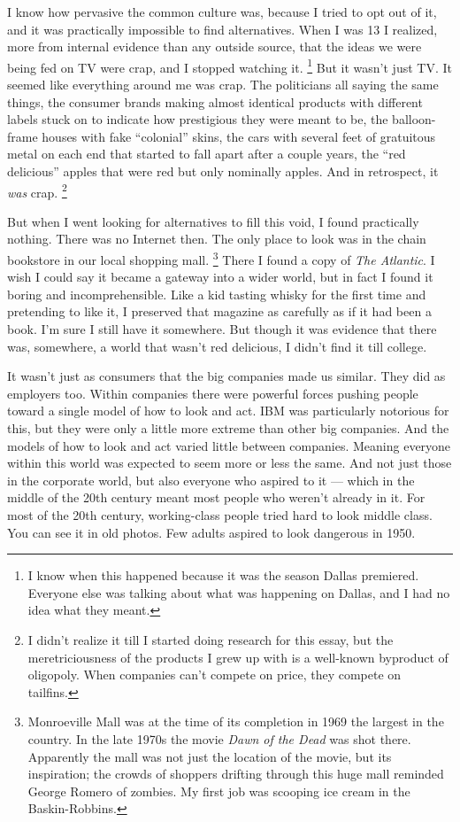 \documentclass[12pt]{book}
\begin{document}
I know how pervasive the common culture was, because I tried to opt out
of it, and it was practically impossible to find alternatives. When I
was 13 I realized, more from internal evidence than any outside source,
that the ideas we were being fed on TV were crap, and I stopped watching
it. \footnote{I know when this happened because it was the season Dallas
premiered. Everyone else was talking about what was happening on Dallas,
and I had no idea what they meant.} But it wasn't just TV. It seemed like
everything around me was crap. The politicians all saying the same
things, the consumer brands making almost identical products with
different labels stuck on to indicate how prestigious they were meant to
be, the balloon-frame houses with fake ``colonial'' skins, the cars with
several feet of gratuitous metal on each end that started to fall apart
after a couple years, the ``red delicious'' apples that were red but
only nominally apples. And in retrospect, it \emph{was} crap.
\footnote{I didn't realize it till I started doing research for this
essay, but the meretriciousness of the products I grew up with is a
well-known byproduct of oligopoly. When companies can't compete on
price, they compete on tailfins.}

But when I went looking for alternatives to fill this void, I found
practically nothing. There was no Internet then. The only place to look
was in the chain bookstore in our local shopping mall.
\footnote{Monroeville Mall was at the time of its completion in 1969 the
largest in the country. In the late 1970s the movie \emph{Dawn of the
Dead} was shot there. Apparently the mall was not just the location of
the movie, but its inspiration; the crowds of shoppers drifting through
this huge mall reminded George Romero of zombies. My first job was
scooping ice cream in the Baskin-Robbins.} There I found a copy of \emph{The Atlantic}. I
wish I could say it became a gateway into a wider world, but in fact I
found it boring and incomprehensible. Like a kid tasting whisky for the
first time and pretending to like it, I preserved that magazine as
carefully as if it had been a book. I'm sure I still have it somewhere.
But though it was evidence that there was, somewhere, a world that
wasn't red delicious, I didn't find it till college.

It wasn't just as consumers that the big companies made us similar. They
did as employers too. Within companies there were powerful forces
pushing people toward a single model of how to look and act. IBM was
particularly notorious for this, but they were only a little more
extreme than other big companies. And the models of how to look and act
varied little between companies. Meaning everyone within this world was
expected to seem more or less the same. And not just those in the
corporate world, but also everyone who aspired to it --- which in the
middle of the 20th century meant most people who weren't already in it.
For most of the 20th century, working-class people tried hard to look
middle class. You can see it in old photos. Few adults aspired to look
dangerous in 1950.
\end{document}
